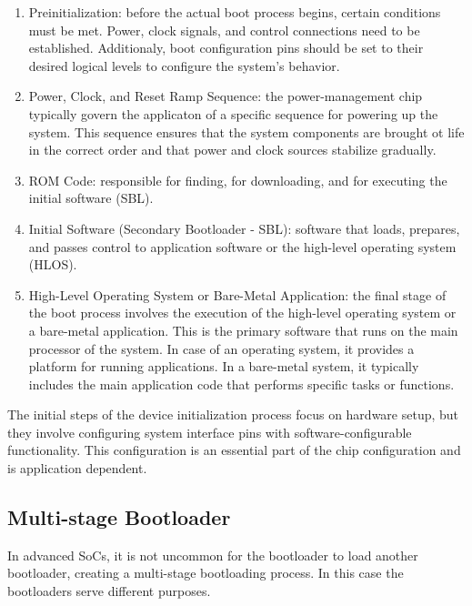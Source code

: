 \begin{enumerate}
    \item   Preinitialization: before the actual boot process begins, certain
            conditions must be met. Power, clock signals, and control
            connections need to be established. Additionaly, boot configuration
            pins should be set to their desired logical levels to configure
            the system's behavior.
    \item   Power, Clock, and Reset Ramp Sequence: the power-management chip
            typically govern the applicaton of a specific sequence for powering
            up the system. This sequence ensures that the system components are
            brought ot life in the correct order and that power and clock
            sources stabilize gradually.
    \item   ROM Code: responsible for finding, for downloading, and for
            executing the initial software (SBL).
    \item   Initial Software (Secondary Bootloader - SBL): software that loads,
            prepares, and passes control to application software or the
            high-level operating system (HLOS).
    \item   High-Level Operating System or Bare-Metal Application: the final
            stage of the boot process involves the execution of the high-level
            operating system or a bare-metal application. This is the primary
            software that runs on the main processor of the system. In case of
            an operating system, it provides a platform for running
            applications. In a bare-metal system, it typically includes the
            main application code that performs specific tasks or functions.
\end{enumerate}

The initial steps of the device initialization process focus on hardware setup,
but they involve configuring system interface pins with software-configurable
functionality. This configuration is an essential part of the chip
configuration and is application dependent.

\subsection{Multi-stage Bootloader}

In advanced SoCs, it is not uncommon for the bootloader to load another
bootloader, creating a multi-stage bootloading process.
In this case the bootloaders serve different purposes.


